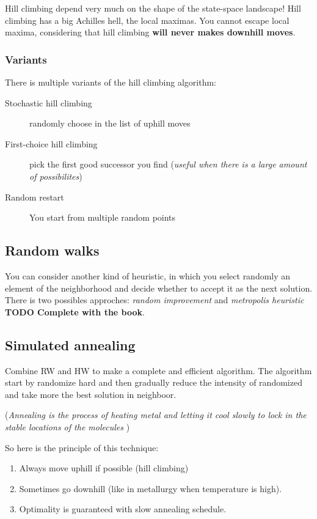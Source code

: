 Hill climbing depend  very  much on  the  shape  of  the state-space  landscape!  Hill
climbing has a  big Achilles hell, the local maximas.  You cannot escape
local maxima,  considering that  hill climbing \textbf{will  never makes
downhill moves}.

\subsubsection{Variants}

There is multiple variants of the hill climbing algorithm:
\begin{description}
    \item[Stochastic hill climbing] randomly choose in the list of uphill moves
    \item[First-choice hill climbing] pick the first good successor you find 
        (\textit{useful when there is a large amount of possibilites})
    \item[Random restart] You start from multiple random points
\end{description}


\subsection{Random walks}

You can consider another kind of heuristic, in which you select randomly
an  element of  the  neighborhood and  decide whether  to  accept it  as
the  next solution.  There  is two  possibles approches:  \textit{random
improvement}  and  \textit{metropolis heuristic}  \textbf{TODO  Complete
with the book}.


\subsection{Simulated annealing}
Combine RW and HW to make a complete and efficient algorithm.
The algorithm start by randomize hard and then gradually reduce the intensity of randomized
and take more the best solution in neighboor.

(\textit{Annealing is the process of heating metal and letting it cool slowly to lock in the stable locations of the molecules} )

So here is the principle of this technique:
\begin{enumerate}
	\item Always move uphill if possible (hill climbing)
	\item Sometimes go downhill (like in metallurgy when temperature is high).
	\item Optimality is guaranteed with slow annealing schedule. 
\end{enumerate}


